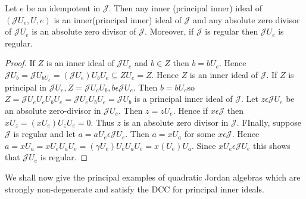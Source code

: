 \begin{lemma}\label{c3:sec5:lem2}
Let $e$ be an idempotent in $\mathscr{J}$. Then any inner (principal
inner) ideal of $(\mathscr{J}U_e,U,e)$ is an inner(principal inner)
ideal of $\mathscr{J}$ and any absolute zero divisor of
$\mathscr{J}U_e$ is an absolute zero divisor of
$\mathscr{J}$. Moreover, if $\mathscr{J}$ is regular then
$\mathscr{J}U_e$ is regular.
\end{lemma}

\begin{proof}
If $Z$ is an inner ideal of $\mathscr{J} U_e$ and
$b\in Z$ then $b=bU_e$. Hence
$\mathscr{J}U_b=\mathscr{J}U_{bU_e}=(\mathscr{J}U_e)U_bU_e\subseteq
Z U_e=Z$. Hence $Z$ is an inner ideal
of $\mathscr{J}$. If $Z$ is principal in
$\mathscr{J}U_e,Z=\mathscr{J}U_eU_b,b\epsilon
\mathscr{J}U_e$. Then $b=bU_e$\pageoriginale so
$Z=\mathscr{J}
U_eU_eU_bU_e=\mathscr{J}U_eU_bU_e=\mathscr{J}U_b$ is a principal inner
ideal of $\mathscr{J}$. Let $z\epsilon \mathscr{J} U_e$ be an absolute
zero-divisor in $\mathscr{J}U_e$. Then $z=zU_e$. Hence if $x\epsilon
\mathscr{J}$ then $xU_z=(xU_e)U_zU_e=0$. Thus $z$ is an absolute zero
divisor in $\mathscr{J}$. FInally, suppose $\mathscr{J}$ is regular
and let $a=aU_e\epsilon \mathscr{J} U_e$. Then $a=xU_a$ for some
$x\epsilon \mathscr{J}$. Hence $a=xU_a=xU_eU_aU_e=(\gamma
U_e)U_eU_aU_e=x(U_e)U_a$. Since $xU_e\epsilon \mathscr{J} U_e$ this
shows that $\mathscr{J}U_e$ is regular.
\end{proof}

We shall now give the principal examples of quadratic Jordan algebras
which are strongly non-degenerate and satisfy the DCC for principal
inner ideals.

